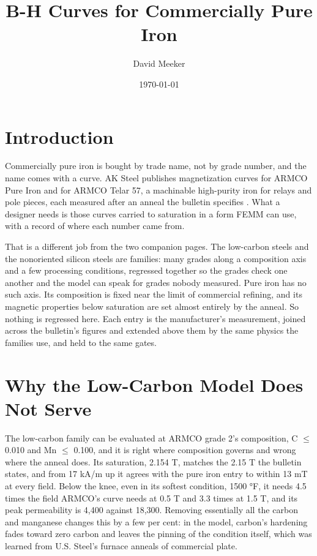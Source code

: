 \documentclass[
  11pt,
]{article}
\title{B-H Curves for Commercially Pure Iron}
\author{David Meeker}
\date{\today}
\begin{document}
\maketitle

\section{Introduction}\label{introduction}

Commercially pure iron is bought by trade name, not by grade number, and the name comes with a curve. AK Steel publishes magnetization curves for ARMCO Pure Iron and for ARMCO Telar 57, a machinable high-purity iron for relays and pole pieces, each measured after an anneal the bulletin specifies \cite{armco-iron,armco-telar}. What a designer needs is those curves carried to saturation in a form FEMM can use, with a record of where each number came from.

That is a different job from the two companion pages. The low-carbon steels \cite{meeker-lowcarbon} and the nonoriented silicon steels \cite{meeker-silicon} are families: many grades along a composition axis and a few processing conditions, regressed together so the grades check one another and the model can speak for grades nobody measured. Pure iron has no such axis. Its composition is fixed near the limit of commercial refining, and its magnetic properties below saturation are set almost entirely by the anneal. So nothing is regressed here. Each entry is the manufacturer's measurement, joined across the bulletin's figures and extended above them by the same physics the families use, and held to the same gates.

\section{Why the Low-Carbon Model Does Not Serve}\label{why-the-low-carbon-model-does-not-serve}

The low-carbon family can be evaluated at ARMCO grade 2's composition, C \(\le\) 0.010 and Mn \(\le\) 0.100, and it is right where composition governs and wrong where the anneal does. Its saturation, 2.154 T, matches the 2.15 T the bulletin states, and from 17 kA/m up it agrees with the pure iron entry to within 13 mT at every field. Below the knee, even in its softest condition, 1500 °F, it needs 4.5 times the field ARMCO's curve needs at 0.5 T and 3.3 times at 1.5 T, and its peak permeability is 4,400 against 18,300. Removing essentially all the carbon and manganese changes this by a few per cent: in the model, carbon's hardening fades toward zero carbon and leaves the pinning of the condition itself, which was learned from U.S. Steel's furnace anneals of commercial plate.
\end{document}
